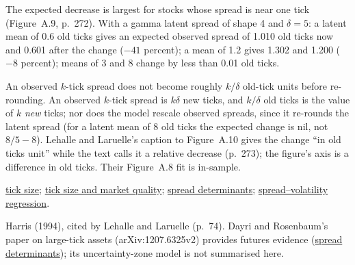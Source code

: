 \begin{qfmodel}
 The expected decrease is largest for stocks whose spread is near one tick (Figure~A.9, p.~272). With a gamma latent spread of shape 4 and $\delta=5$: a latent mean of 0.6 old ticks gives an expected observed spread of 1.010 old ticks now and 0.601 after the change ($-41$ percent); a mean of 1.2 gives 1.302 and 1.200 ($-8$ percent); means of 3 and 8 change by less than 0.01 old ticks.

 An observed $k$-tick spread does not become roughly $k/\delta$ old-tick units before re-rounding. An observed $k$-tick spread is $k\delta$ new ticks, and $k/\delta$ old ticks is the value of $k$ \emph{new} ticks; nor does the model rescale observed spreads, since it re-rounds the latent spread (for a latent mean of 8 old ticks the expected change is nil, not $8/5-8$). Lehalle and Laruelle's caption to Figure~A.10 gives the change ``in old ticks unit'' while the text calls it a relative decrease (p.~273); the figure's axis is a difference in old ticks. Their Figure~A.8 fit is in-sample.

 \hyperref[def:tick-size]{tick size}; \hyperref[ev:tick-size-market-quality]{tick size and market quality}; \hyperref[res:spread-determinants]{spread determinants}; \hyperref[meth:spread-volatility-regression]{spread--volatility regression}.

 Harris (1994), cited by Lehalle and Laruelle (p.~74). Dayri and Rosenbaum's paper on large-tick assets (arXiv:1207.6325v2) provides futures evidence (\hyperref[res:spread-determinants]{spread determinants}); its uncertainty-zone model is not summarised here.

\end{qfmodel}
